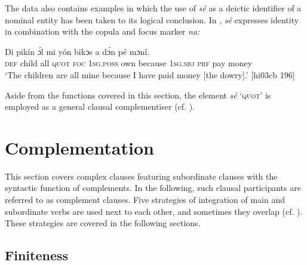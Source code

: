 \ea%
    \label{ex:key:1379}
\z\z

The data also contains examples in which the use of \textit{sé} as a deictic identifier of a nominal entity has been taken to its logical conclusion. In , \textit{sé} expresses identity in combination with the copula and focus marker \textit{na:}


\ea%
    \label{ex:key:1380}
    \gll Di  pikín  ɔ́l       mi    yón   
bikɔs  a    dɔ́n  pé  mɔní.\\
    \textsc{def}  child  all  \textsc{quot}    \textsc{foc}  \textsc{1sg.poss}  own  
because  \textsc{1sg.sbj}  \textsc{prf}  pay  money\\

\glt ‘The children are all mine because I have paid money 
[the dowry].’ [hi03cb 196]
\z

Aside from the functions covered in this section, the element \textit{sé} ‘\textsc{quot}’ is employed as a general clausal complementiser (cf. ). 

\section{Complementation}\label{sec:10.5}

This section covers complex clauses featuring subordinate clauses with the syntactic function of complements. In the following, such clausal participants are referred to as complement clauses. Five strategies of integration of main and subordinate verbs are used next to each other, and sometimes they overlap (cf. ). These strategies are covered in the following sections. 

\subsection{Finiteness}\label{sec:10.5.1}

